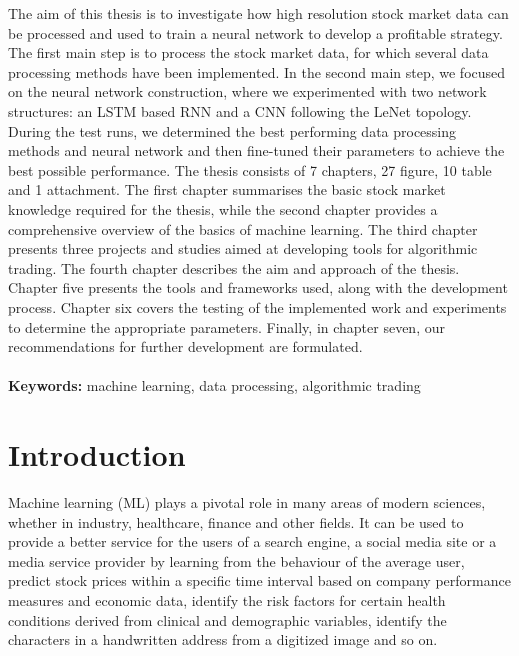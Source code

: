 \documentclass[a4paper,oneside,onecolumn,12pt]{book}
\begin{document}
\thispagestyle{empty}
The aim of this thesis is to investigate how high resolution stock market data can be processed and used to train a neural network to develop a profitable strategy. The first main step is to process the stock market data, for which several data processing methods have been implemented. In the second main step, we focused on the neural network construction, where we experimented with two network structures: an LSTM based RNN and a CNN following the LeNet topology. During the test runs, we determined the best performing data processing methods and neural network and then fine-tuned their parameters to achieve the best possible performance. The thesis consists of 7 chapters, 27 figure, 10 table and 1 attachment. The first chapter summarises the basic stock market knowledge required for the thesis, while the second chapter provides a comprehensive overview of the basics of machine learning. The third chapter presents three projects and studies aimed at developing tools for algorithmic trading. The fourth chapter describes the aim and approach of the thesis. Chapter five presents the tools and frameworks used, along with the development process. Chapter six covers the testing of the implemented work and experiments to determine the appropriate parameters. Finally, in chapter seven, our recommendations for further development are formulated.
\\\\
\textbf{Keywords:} machine learning, data processing, algorithmic trading
\pagebreak

\tableofcontents
\thispagestyle{empty}

\listoffigures
\thispagestyle{empty}


\section*{Introduction}
Machine learning (ML) plays a pivotal role in many areas of modern sciences, whether in industry, healthcare, finance and other fields. It can be used to provide a better service for the users of a search engine, a social media site or a media service provider by learning from the behaviour of the average user, predict stock prices within a specific time interval based on company performance measures and economic data, identify the risk factors for certain health conditions derived from clinical and demographic variables, identify the characters in a handwritten address from a digitized image and so on. \cite{TESL}
\end{document}
